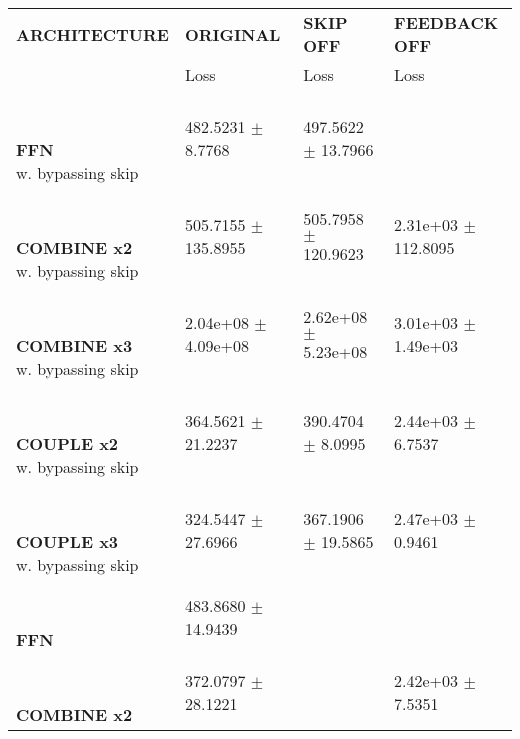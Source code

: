 
\begin{table}[ht]
    \centering
    \begin{tabular}{|>{\columncolor{gray!05}}l|l|l|l|}
        \hline
        \rowcolor{white}
        \textbf{\footnotesize ARCHITECTURE} & \textbf{\footnotesize ORIGINAL} & \textbf{\footnotesize SKIP OFF} & \textbf{\footnotesize FEEDBACK OFF} \\

        \rowcolor{white}
        & {\footnotesize Loss} & {\footnotesize Loss} & {\footnotesize Loss} \\
        \hline
\shortstack[l]{\\ {} \\ \textbf{\footnotesize FFN}\\{\footnotesize w. bypassing skip}} & 482.5231 $\pm$ 8.7768 & 497.5622 $\pm$ 13.7966 &  \\
 \hline 
\shortstack[l]{\\ {} \\ \textbf{\footnotesize COMBINE x2}\\{\footnotesize w. bypassing skip}} & 505.7155 $\pm$ 135.8955 & 505.7958 $\pm$ 120.9623 & 2.31e+03 $\pm$ 112.8095 \\
 \hline 
\shortstack[l]{\\ {} \\ \textbf{\footnotesize COMBINE x3}\\{\footnotesize w. bypassing skip}} & 2.04e+08 $\pm$ 4.09e+08 & 2.62e+08 $\pm$ 5.23e+08 & 3.01e+03 $\pm$ 1.49e+03 \\
 \hline 
\shortstack[l]{\\ {} \\ \textbf{\footnotesize COUPLE x2}\\{\footnotesize w. bypassing skip}} & 364.5621 $\pm$ 21.2237 & 390.4704 $\pm$ 8.0995 & 2.44e+03 $\pm$ 6.7537 \\
 \hline 
\shortstack[l]{\\ {} \\ \textbf{\footnotesize COUPLE x3}\\{\footnotesize w. bypassing skip}} & 324.5447 $\pm$ 27.6966 & 367.1906 $\pm$ 19.5865 & 2.47e+03 $\pm$ 0.9461 \\
 \hline 
\shortstack[l]{\\ {} \\ \textbf{\footnotesize FFN}\\{\footnotesize }} & 483.8680 $\pm$ 14.9439 &  &  \\
 \hline 
\shortstack[l]{\\ {} \\ \textbf{\footnotesize COMBINE x2}\\{\footnotesize }} & 372.0797 $\pm$ 28.1221 &  & 2.42e+03 $\pm$ 7.5351 \\

\end{tabular}
\end{table}
